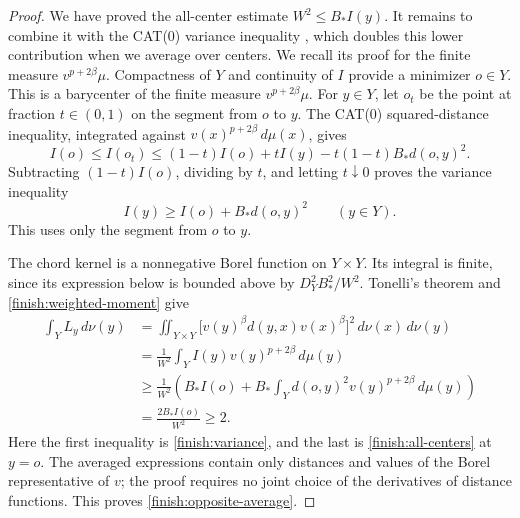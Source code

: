 \documentclass[11pt]{article}
\numberwithin{equation}{section}
\theoremstyle{definition}
\theoremstyle{remark}
\begin{document}
\begin{proof}
We have proved the all-center estimate \(W^2\le B_*I(y)\).
It remains to combine it with the CAT(0) variance inequality
\cite[Proposition~4.4]{Sturm2003}, which doubles this lower contribution
when we average over centers. We recall its proof for the finite measure
$v^{p+2\beta}\mu$.
Compactness of \(Y\) and continuity of \(I\) provide a minimizer
\(o\in Y\). This is a barycenter of the finite measure
\(v^{p+2\beta}\mu\). For \(y\in Y\), let \(o_t\) be the point at
fraction \(t\in(0,1)\) on the segment from \(o\) to \(y\). The
CAT(0) squared-distance inequality, integrated against
\(v(x)^{p+2\beta}\,d\mu(x)\), gives
\[
 I(o)\le I(o_t)
 \le(1-t)I(o)+tI(y)-t(1-t)B_*d(o,y)^2.
\]
Subtracting \((1-t)I(o)\), dividing by \(t\), and letting
\(t\downarrow0\) proves the variance inequality
\begin{equation}
 \label{finish:variance}
 I(y)\ge I(o)+B_*d(o,y)^2\qquad(y\in Y).
\end{equation}
This uses only the segment from \(o\) to \(y\).

The chord kernel is a nonnegative Borel function on \(Y\times Y\).
Its integral is finite, since its expression below is bounded above by
\(D_Y^2B_*^2/W^2\). Tonelli's theorem and
\eqref{finish:weighted-moment} give
\begin{equation}
 \label{finish:double-integral}
 \begin{aligned}
 \int_YL_y\,d\nu(y)
 &=\iint_{Y\times Y}
       \bigl[v(y)^\beta d(y,x)v(x)^\beta\bigr]^2
             \,d\nu(x)\,d\nu(y)\\
 &=\frac1{W^2}\int_Y I(y)v(y)^{p+2\beta}\,d\mu(y)\\
 &\ge\frac1{W^2}\left(
       B_*I(o)+B_*\int_Y d(o,y)^2v(y)^{p+2\beta}\,d\mu(y)
                  \right)\\
 &=\frac{2B_*I(o)}{W^2}\ge2.
 \end{aligned}
\end{equation}
Here the first inequality is \eqref{finish:variance}, and the last is
\eqref{finish:all-centers} at \(y=o\). The averaged expressions contain
only distances and values of the Borel representative of \(v\); the
proof requires no joint choice of the derivatives of distance
functions. This proves \eqref{finish:opposite-average}.
\end{proof}
\end{document}
